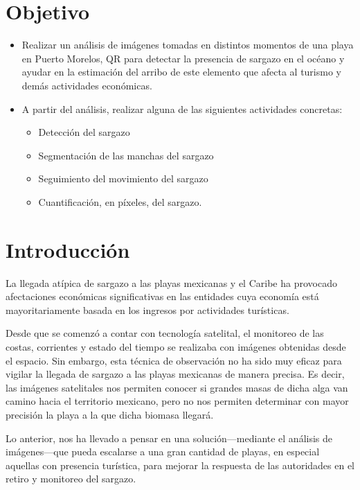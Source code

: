 \documentclass[conference]{IEEEtran}
\begin{document}
\section{Objetivo}
\begin{itemize}
    \item Realizar un análisis de imágenes tomadas en distintos momentos de una playa en Puerto Morelos, QR para detectar la presencia de sargazo en el océano y ayudar en la estimación del arribo de este elemento que afecta al turismo y demás actividades económicas.
    \item A partir del análisis, realizar alguna de las siguientes actividades concretas:
    \begin{itemize}
        \item Detección del sargazo
        \item Segmentación de las manchas del sargazo
        \item Seguimiento del movimiento del sargazo
        \item Cuantificación, en píxeles, del sargazo.
    \end{itemize}
\end{itemize}

\section{Introducción}

La llegada atípica de sargazo a las playas mexicanas y el Caribe ha provocado afectaciones económicas significativas en las entidades cuya economía está mayoritariamente basada en los ingresos por actividades turísticas.

Desde que se comenzó a contar con tecnología satelital, el monitoreo de las costas, corrientes y estado del tiempo se realizaba con imágenes obtenidas desde el espacio. Sin embargo, esta técnica de observación no ha sido muy eficaz para vigilar la llegada de sargazo a las playas mexicanas de manera precisa. Es decir, las imágenes satelitales nos permiten conocer si grandes masas de dicha alga van camino hacia el territorio mexicano, pero no nos permiten determinar con mayor precisión la playa a la que dicha biomasa llegará.

Lo anterior, nos ha llevado a pensar en una solución---mediante el análisis de imágenes---que pueda escalarse a una gran cantidad de playas, en especial aquellas con presencia turística, para mejorar la respuesta de las autoridades en el retiro y monitoreo del sargazo.
\end{document}
